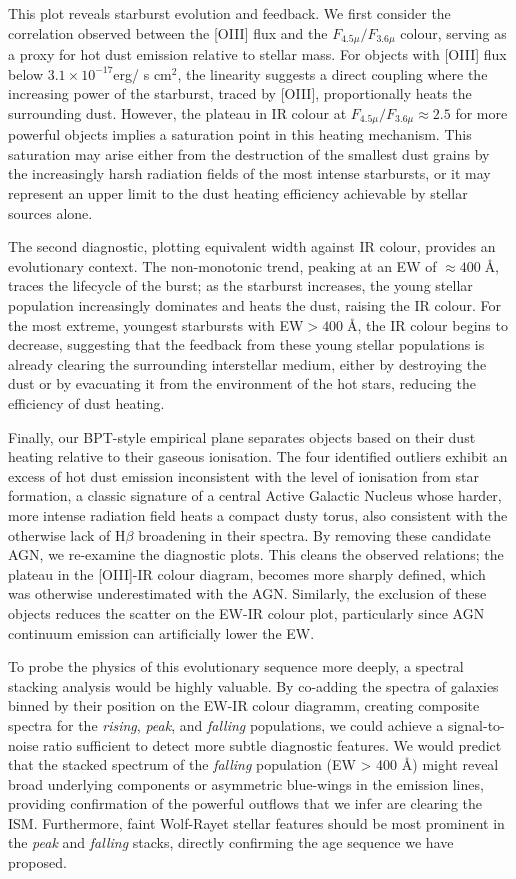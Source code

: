 \documentclass[fleqn,usenatbib]{mnras}
\begin{document}
This plot reveals starburst evolution and feedback. We first consider the correlation observed between the [OIII] flux and the $F_{4.5\mu}/F_{3.6\mu}$ colour, serving as a proxy for hot dust emission relative to stellar mass. For objects with [OIII] flux below $3.1\times10^{-17}$erg/ s cm$^2$, the linearity suggests a direct coupling where the increasing power of the starburst, traced by [OIII], proportionally heats the surrounding dust. However, the plateau in IR colour at $F_{4.5\mu}/F_{3.6\mu}\approx2.5$ for more powerful objects implies a saturation point in this heating mechanism. This saturation may arise either from the destruction of the smallest dust grains by the increasingly harsh radiation fields of the most intense starbursts, or it may represent an upper limit to the dust heating efficiency achievable by stellar sources alone. 

The second diagnostic, plotting equivalent width against IR colour, provides an evolutionary context. The non-monotonic trend, peaking at an EW of $\approx400\;$\AA, traces the lifecycle of the burst; as the starburst increases, the young stellar population increasingly dominates and heats the dust, raising the IR colour. For the most extreme, youngest starbursts with EW$>400\;$\AA, the IR colour begins to decrease, suggesting that the feedback from these young stellar populations is already clearing the surrounding interstellar medium, either by destroying the dust or by evacuating it from the environment of the hot stars, reducing the efficiency of dust heating. 

Finally, our BPT-style empirical plane separates objects based on their dust heating relative to their gaseous ionisation. The four identified outliers exhibit an excess of hot dust emission inconsistent with the level of ionisation from star formation, a classic signature of a central Active Galactic Nucleus whose harder, more intense radiation field heats a compact dusty torus, also consistent with the otherwise lack of H$\beta$ broadening in their spectra. By removing these candidate AGN, we re-examine the diagnostic plots. This cleans the observed relations; the plateau in the [OIII]-IR colour diagram, becomes more sharply defined, which was otherwise underestimated with the AGN. Similarly, the exclusion of these objects reduces the scatter on the EW-IR colour plot, particularly since AGN continuum emission can artificially lower the EW.

To probe the physics of this evolutionary sequence more deeply, a spectral stacking analysis would be highly valuable. By co-adding the spectra of galaxies binned by their position on the EW-IR colour diagramm, creating composite spectra for the \textit{rising}, \textit{peak}, and \textit{falling} populations, we could achieve a signal-to-noise ratio sufficient to detect more subtle diagnostic features. We would predict that the stacked spectrum of the \textit{falling} population (EW > 400 Å) might reveal broad underlying components or asymmetric blue-wings in the emission lines, providing confirmation of the powerful outflows that we infer are clearing the ISM. Furthermore, faint Wolf-Rayet stellar features should be most prominent in the \textit{peak} and \textit{falling} stacks, directly confirming the age sequence we have proposed.
\end{document}
